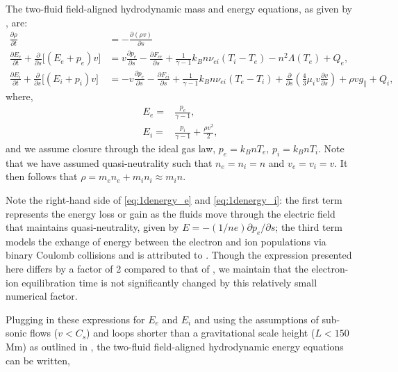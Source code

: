 \documentclass[]{aastex}
\begin{document}
	\section{}
	\label{appendix_two_fluid}
	\par The two-fluid field-aligned hydrodynamic mass and energy equations, as given by \citet{bradshaw_influence_2013}, are:
	\begin{align}
		\frac{\partial\rho}{\partial t} &= -\frac{\partial(\rho v)}{\partial s} \label{eq:1dmass} \\[0.5em]
		\frac{\partial E_e}{\partial t} + \frac{\partial}{\partial s} \lbrack(E_e+p_e)v\rbrack &= v\frac{\partial p_e}{\partial s} - \frac{\partial F_{ce}}{\partial s} + \frac{1}{\gamma - 1}k_Bn\nu_{ei}(T_i-T_e) -n^2\Lambda(T_e)+Q_{e} , \label{eq:1denergy_e} \\[0.5em]
		\frac{\partial E_i}{\partial t} + \frac{\partial }{\partial s}\lbrack(E_i+p_i)v\rbrack &= -v\frac{\partial p_e}{\partial s} - \frac{\partial F_{ci}}{\partial s} + \frac{1}{\gamma - 1}k_Bn\nu_{ei}(T_e-T_i) + \frac{\partial}{\partial s}\left(\frac{4}{3}\mu_iv\frac{\partial v}{\partial s}\right) +\rho v g_{\parallel} + Q_{i},\label{eq:1denergy_i}
	\end{align}
	where,
	\begin{align}
		E_e =& \frac{p_e}{\gamma - 1} \label{eq:ee_closure}, \\[0.5em]
		E_i =& \frac{p_i}{\gamma - 1} + \frac{\rho v^2}{2}, \label{eq:ei_closure}
	\end{align}
	and we assume closure through the ideal gas law, $p_e=k_BnT_e,\,p_i=k_BnT_i$. Note that we have assumed quasi-neutrality such that $n_e=n_i=n$ and $v_e=v_i=v$. It then follows that $\rho=m_en_e+m_in_i\approx m_in$.
	\par Note the right-hand side of \autoref{eq:1denergy_e} and \autoref{eq:1denergy_i}: the first term represents the energy loss or gain as the fluids move through the electric field that maintains quasi-neutrality, given by $E=-(1/ne)\partial p_e/\partial s$; the third term models the exhange of energy between the electron and ion populations via binary Coulomb collisions and is attributed to \citet{braginskii_transport_1965}. Though the expression presented here differs by a factor of 2 compared to that of \citeauthor{braginskii_transport_1965}, we maintain that the electron-ion equilibration time is not significantly changed by this relatively small numerical factor. 
	\par Plugging in these expressions for $E_e$ and $E_i$ and using the assumptions of sub-sonic flows ($v<C_s$) and loops shorter than a gravitational scale height ($L<150$ Mm) as outlined in \citet{klimchuk_highly_2008}, the two-fluid field-aligned hydrodynamic energy equations can be written,
\end{document}
